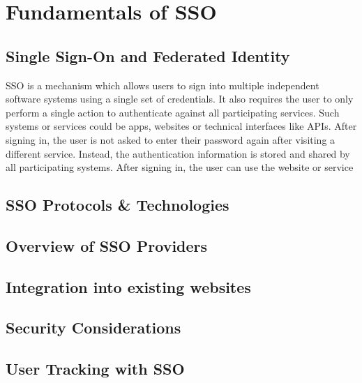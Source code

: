 \section{Fundamentals of \ac{SSO}}


\subsection{Single Sign-On and Federated Identity}

\ac{SSO} is a mechanism which allows users to sign into multiple independent software systems
using a single set of credentials.
It also requires the user to only perform a single action to authenticate against all participating services.
Such systems or services could be apps, websites or technical interfaces like \acp{API}.
After signing in, the user is not asked to enter their password again after visiting a different service.
Instead, the authentication information is stored and shared by all participating systems.
After signing in, the user can use the website or service 


\subsection{\ac{SSO} Protocols \& Technologies}


\subsection{Overview of \ac{SSO} Providers}



\subsection{Integration into existing websites}

\subsection{Security Considerations}

\subsection{User Tracking with \ac{SSO}}